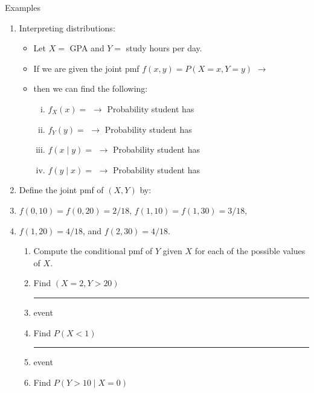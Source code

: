 \documentclass{article}
\newcommand{\blankul}[1]{\rule[-1.5mm]{#1}{0.15mm}}	%
\begin{document}
Examples\bigskip
\begin{enumerate}
    \item Interpreting distributions:
    \begin{itemize}
        \item Let $X = $ GPA and $Y = $ study hours per day.
        \item[] If we are given the joint pmf $f(x, y) = P(X = x, Y = y)$ $\longrightarrow$ 
        \item[] then we can find the following:
        \begin{enumerate}[i)]
            \item $f_X(x) = $ \hspace{85pt} $\longrightarrow$ Probability student has\medskip
            \item $f_Y(y) = $ \hspace{85pt} $\longrightarrow$ Probability student has\medskip
            \item $f(x \mid y) = $ \hspace{80pt}$\longrightarrow$ Probability student has\medskip
            \item $f(y \mid x) = $ \hspace{80pt}$\longrightarrow$ Probability student has\medskip 
        \end{enumerate}
    \end{itemize}
    \item Define the joint pmf of $(X,Y)$ by:
    \item[] $f(0,10) = f(0,20) = 2/18$, \hspace{5pt} $f(1,10) = f(1,30) = 3/18$,
    \item[] $f(1,20) = 4/18$, \hspace{5pt} and \hspace{5pt} $f(2,30) = 4/18$.
    \begin{enumerate}
        \item Compute the conditional pmf of $Y$ given $X$ for each of the possible values of $X$.\vspace{370pt}
        \item Find $(X = 2, Y > 20)$
        \item[] \blankul{2cm} event \vspace{15pt}
        \item Find $P(X < 1)$
        \item[] \blankul{2cm} event \vspace{15pt}
        \item Find $P(Y > 10 \mid X = 0)$

\end{enumerate}
\end{enumerate}
\end{document}
